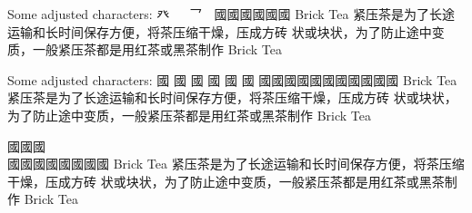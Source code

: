 
\FPmul{}%
\FPmul{}\begin{multicols}{2}
Some adjusted characters:
{\cjk{}
{\cnxBabel{}癶\cjkgGlue}
{\cnxJzr{}\cjkgGlue}
{\cnjzr{}\cjkgGlue}
{乛\cjkgGlue}
{\cnjzr{}\cjkgGlue}
國國國國國國} Brick Tea {\cjk{}紧压茶是为了长途运输和长时间保存方便，将茶压缩干燥，压成方砖
状或块状，为了防止途中变质，一般紧压茶都是用红茶或黑茶制作} Brick Tea
\end{multicols}\begin{multicols}{2}
Some adjusted characters:
{\cjk{}國
國
國
國
國
國
國國國國國國國國國國國} Brick Tea {\cjk{}紧压茶是为了长途运输和长时间保存方便，将茶压缩干燥，压成方砖
状或块状，为了防止途中变质，一般紧压茶都是用红茶或黑茶制作} Brick Tea
\end{multicols}\begin{multicols}{2}
{\cjk{}國國國}\\{\cjk{}國國國國國國國國} Brick Tea {\cjk{}紧压茶是为了长途运输和长时间保存方便，将茶压缩干燥，压成方砖
状或块状，为了防止途中变质，一般紧压茶都是用红茶或黑茶制作} Brick Tea
\end{multicols}
